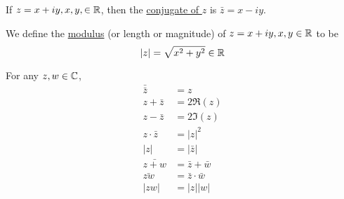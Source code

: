 \documentclass[11pt]{article}
\begin{document}
\begin{definition}
If $z = x + iy, x, y, \in \mathbb{R}$, then the \underline{conjugate of $z$} is
$\bar{z} = x - iy$.
\end{definition}
\begin{definition}
We define the \underline{modulus} (or length or magnitude) of $z = x + iy, x, y \in \mathbb{R}$ to
be
\begin{equation*}
|z| = \sqrt{x^2 + y^2} \in \mathbb{R}
\end{equation*}
\end{definition}
\begin{remark}
For any $z, w \in \mathbb{C}$,
\begin{align*}
\bar{\bar{z}} &= z\\
z + \bar{z} &= 2\Re(z)\\
z - \bar{z} &= 2\Im(z)\\
z\cdot\bar{z} &= |z|^2\\
|z| &= |\bar{z}|\\
\bar{z+w} &= \bar z + \bar w\\
\bar{zw} &= \bar z\cdot\bar w\\
|zw| &= |z||w|
\end{align*}
\end{remark}
\end{document}
